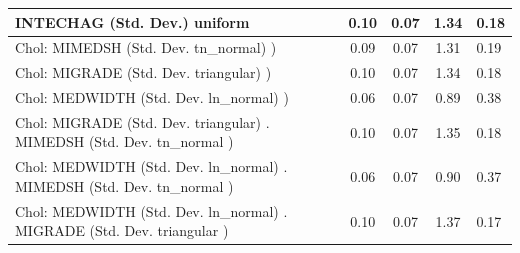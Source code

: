 \begin{table}
\begin{center}
\begin{tabular}{|l|l|c|c|c|l|}
			\hline
			INTECHAG (Std. Dev.) uniform &  & 0.10 & 0.07 & 1.34 & 0.18 \\
			\hline
			 Chol: MIMEDSH (Std. Dev. tn_normal) ) &  & 0.09 & 0.07 & 1.31 & 0.19 \\
			\hline
			 Chol: MIGRADE (Std. Dev. triangular) ) &  & 0.10 & 0.07 & 1.34 & 0.18 \\
			\hline
			 Chol: MEDWIDTH (Std. Dev. ln_normal) ) &  & 0.06 & 0.07 & 0.89 & 0.38 \\
			\hline
			 Chol: MIGRADE (Std. Dev. triangular) . MIMEDSH (Std. Dev.   tn_normal ) &  & 0.10 & 0.07 & 1.35 & 0.18 \\
			\hline
			 Chol: MEDWIDTH (Std. Dev. ln_normal) . MIMEDSH (Std. Dev.   tn_normal ) &  & 0.06 & 0.07 & 0.90 & 0.37 \\
			\hline
			 Chol: MEDWIDTH (Std. Dev. ln_normal) . MIGRADE (Std. Dev.   triangular ) &  & 0.10 & 0.07 & 1.37 & 0.17 \\
			\hline
		\end{tabular}
	\end{center}
\end{table}